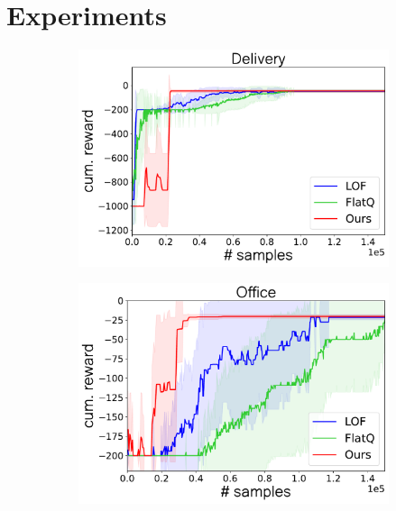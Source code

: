 \section{Experiments}
\begin{figure}[htb]
 \begin{subfigure}[t]{0.5\textwidth}
    \centering
    \includegraphics[scale=0.28]{figures/chapter3/results/delivery_learning.pdf}  
  \end{subfigure}
  \hfill
   \begin{subfigure}[t]{0.5\textwidth}
    \centering
    \includegraphics[scale=0.28]{figures/chapter3/results/office_learning.pdf}  
  \end{subfigure}
   \begin{subfigure}[b]{0.5\textwidth}

\end{subfigure}
\end{figure}
